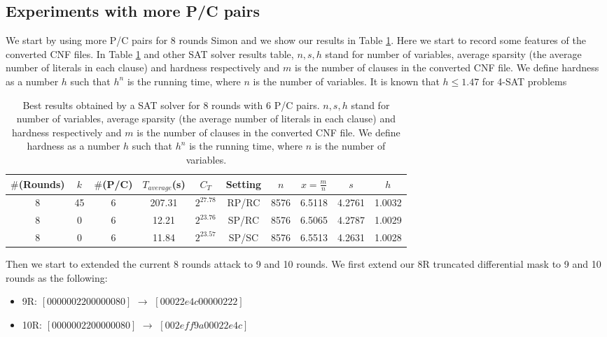 \subsection{Experiments with more P/C pairs}
We start by using more P/C pairs for 8 rounds Simon and we show our results in Table \ref{tab:8RmorePC}. Here we start to record some features of the converted CNF files. In Table \ref{tab:8RmorePC} and other SAT solver results table, $n,s,h$ stand for number of variables, average sparsity (the average number of literals in each clause) and hardness respectively and $m$ is the number of clauses in the converted CNF file.
We define hardness as a number $h$ such that $h^n$ is the running time, where $n$ is the number of variables.
It is known that $h\leq 1.47$ for 4-SAT problems \cite{semaev}

\begin{table}[!hh]
	\caption[Best results obtained by a SAT solver for 8 rounds with 6 P/C pairs]{Best results obtained by a SAT solver for 8 rounds with 6 P/C pairs. $n,s,h$ stand for number of variables, average sparsity (the average number of literals in each clause) and hardness respectively and $m$ is the number of clauses in the converted CNF file.
		We define hardness as a number $h$ such that $h^n$ is the running time, where $n$ is the number of variables. }\label{tab:8RmorePC} \centering
	\begin{tabular}{|c|c|c|c|c|c|c|c|c|c|}
		\hline
		$\#$(Rounds) & $k$ & $\#$(P/C) & $T_{average}$(s) & $C_T$ & Setting & $n$ & $x=\frac{m}{n}$ & $s$ & $h$ \\
		\hline
		8 & 45 & 6 & 207.31   & $2^{27.78}$ & RP/RC & 8576	& 6.5118	& 4.2761	& 1.0032 \\
		\hline
		8 & 0  & 6 & 12.21   & $2^{23.76}$ & SP/RC  & 8576	& 6.5065	& 4.2787	& 1.0029  \\
		\hline
		8 & 0  & 6 & 11.84   & $2^{23.57}$ & SP/SC  & 8576	& 6.5513	& 4.2631	& 1.0028 \\
		\hline
	\end{tabular}
\end{table}


Then we start to extended the current 8 rounds attack to 9 and 10 rounds. We first extend our 8R truncated differential mask to 9 and 10 rounds as the following:
\begin{itemize}
	\item 9R: $[00000022 00000080]$ $\rightarrow$ $[00022e4c 00000222]$
	\item 10R: $[00000022 00000080]$ $\rightarrow$ $[002eff9a 00022e4c]$ 
\end{itemize}

